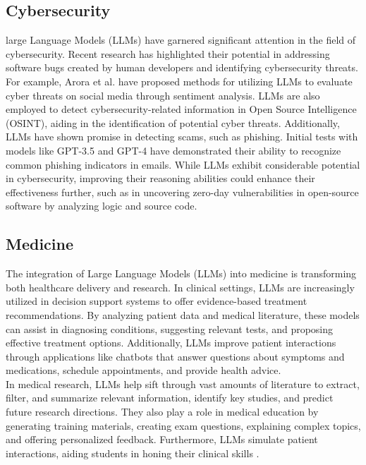 \subsection{Cybersecurity}
large Language Models (LLMs) have garnered significant attention in the field of cybersecurity. Recent research has highlighted their potential in addressing software bugs created by human developers and identifying cybersecurity threats. For example, Arora et al. have proposed methods for utilizing LLMs to evaluate cyber threats on social media through sentiment analysis. LLMs are also employed to detect cybersecurity-related information in Open Source Intelligence (OSINT), aiding in the identification of potential cyber threats. Additionally, LLMs have shown promise in detecting scams, such as phishing. Initial tests with models like GPT-3.5 and GPT-4 have demonstrated their ability to recognize common phishing indicators in emails. While LLMs exhibit considerable potential in cybersecurity, improving their reasoning abilities could enhance their effectiveness further, such as in uncovering zero-day vulnerabilities in open-source software by analyzing logic and source code\cite{helwe2024}.
\subsection{Medicine}
The integration of Large Language Models (LLMs) into medicine is transforming both healthcare delivery and research. In clinical settings, LLMs are increasingly utilized in decision support systems to offer evidence-based treatment recommendations. By analyzing patient data and medical literature, these models can assist in diagnosing conditions, suggesting relevant tests, and proposing effective treatment options. Additionally, LLMs improve patient interactions through applications like chatbots that answer questions about symptoms and medications, schedule appointments, and provide health advice.\\
In medical research, LLMs help sift through vast amounts of literature to extract, filter, and summarize relevant information, identify key studies, and predict future research directions. They also play a role in medical education by generating training materials, creating exam questions, explaining complex topics, and offering personalized feedback. Furthermore, LLMs simulate patient interactions, aiding students in honing their clinical skills \cite{Naveed2024}.
